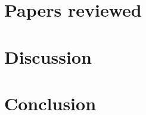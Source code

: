 \section{Papers reviewed}






\section{Discussion}\label{sec:discussion}



\section{Conclusion}








